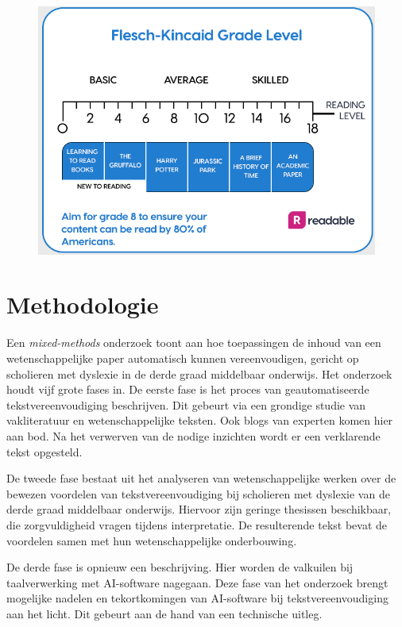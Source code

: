 \begin{figure}
	\includegraphics[width=\linewidth]{img/Screenshot_302.png}
	\caption{\autocite{Readable2021}}
\end{figure}

\section{Methodologie}%
\label{sec:methodologie}
Een \textit{mixed-methods} onderzoek toont aan hoe toepassingen de inhoud van een wetenschappelijke paper automatisch kunnen vereenvoudigen, gericht op scholieren met dyslexie in de derde graad middelbaar onderwijs. Het onderzoek houdt vijf grote fases in. De eerste fase is het proces van geautomatiseerde tekstvereenvoudiging beschrijven. Dit gebeurt via een grondige studie van vakliteratuur en wetenschappelijke teksten. Ook blogs van experten komen hier aan bod. Na het verwerven van de nodige inzichten wordt er een verklarende tekst opgesteld.

De tweede fase bestaat uit het analyseren van wetenschappelijke werken over de bewezen voordelen van tekstvereenvoudiging bij scholieren met dyslexie van de derde graad middelbaar onderwijs. Hiervoor zijn geringe thesissen beschikbaar, die zorgvuldigheid vragen tijdens interpretatie. De resulterende tekst bevat de voordelen samen met hun wetenschappelijke onderbouwing.

De derde fase is opnieuw een beschrijving. Hier worden de valkuilen bij taalverwerking met AI-software nagegaan. Deze fase van het onderzoek brengt mogelijke nadelen en tekortkomingen van AI-software bij tekstvereenvoudiging aan het licht. Dit gebeurt aan de hand van een technische uitleg.

